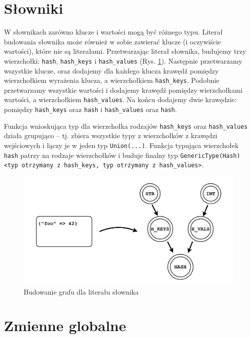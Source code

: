 \documentclass[shortabstract,mgr]{iithesis}
\begin{document}
\section{Słowniki}

W słownikach zarówno klucze i wartości mogą być różnego typu. Literał budowania słownika może również w sobie zawierać klucze (i oczywiście wartości), które nie są literałami. Przetwarzając literał słownika, budujemy trzy wierzchołki: \texttt{hash}, \texttt{hash\_keys} i \texttt{hash\_values} (Rys. \ref{fig:graph-hash}). Następnie przetwarzamy wszystkie klucze, oraz dodajemy dla każdego klucza krawędź pomiędzy wierzchołkiem wyrażenia klucza, a wierzchołkiem \texttt{hash\_keys}. Podobnie przetwarzamy wszystkie wartości i dodajemy krawędź pomiędzy wierzchołkami wartości, a wierzchołkiem \texttt{hash\_values}. Na końcu dodajemy dwie krawędzie: pomiędzy \texttt{hash\_keys} oraz \texttt{hash} i \texttt{hash\_values} oraz \texttt{hash}.

Funkcja wnioskująca typ dla wierzchołka rodzajów \texttt{hash\_keys} oraz \texttt{hash\_values} działa grupująco -- tj. zbiera wszystkie typy z wierzchołków z krawędzi wejściowych i łączy je w jeden typ \texttt{Union(...)}.
Funkcja typująca wierzchołek \texttt{hash} patrzy na rodzaje wierzchołków i buduje finalny typ \texttt{GenericType(Hash)<typ otrzymany z hash\_keys, typ otrzymany z hash\_values>}.


\begin{figure}[htb]
	\centering
	\includegraphics[scale=0.4]{imgs/hash.png}
	\caption{Budowanie grafu dla literału słownika}
	\label{fig:graph-hash}
\end{figure}

\section{Zmienne globalne}
\end{document}
